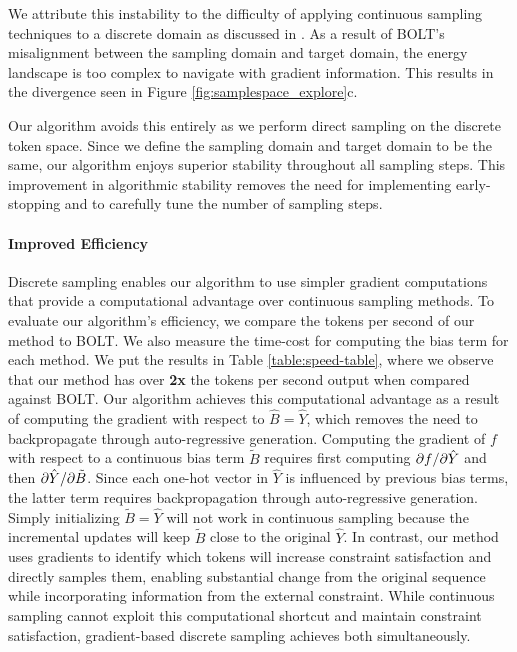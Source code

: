 We attribute this instability to the difficulty of applying continuous sampling techniques to a discrete domain as discussed in \citet{grathwohl2021gwg}. 
As a result of BOLT's misalignment between the sampling domain and target domain, the energy landscape is too complex to navigate with gradient information.
This results in the divergence seen in Figure \ref{fig:samplespace_explore}c. 



Our algorithm avoids this entirely as we perform direct sampling on the discrete token space. 
Since we define the sampling domain and target domain to be the same, our algorithm enjoys superior stability throughout all sampling steps. 
This improvement in algorithmic stability removes the need for implementing early-stopping and to carefully tune the number of sampling steps. 
\vspace{-1em}
 
\vspace{-0.8em}
\paragraph{Improved Efficiency} Discrete sampling enables our algorithm to use simpler gradient computations that provide a computational advantage over continuous sampling methods. 
To evaluate our algorithm's efficiency, we compare the tokens per second of our method to BOLT. 
We also measure the time-cost for computing the bias term for each method. 
We put the results in Table \ref{table:speed-table}, where we observe that our method has over \textbf{2x} the tokens per second output when compared against BOLT. 
Our algorithm achieves this computational advantage as a result of computing the gradient with respect to $\hat{B} = \hat{Y}$, which removes the need to backpropagate through auto-regressive generation. Computing the gradient of $f$ with respect to a continuous bias term $\tilde{B}$ requires first computing ${\partial f}/{\partial \hat{Y}}$ and then ${\partial \hat{Y}}/{\partial \tilde{B}}$.
Since each one-hot vector in $\hat{Y}$ is influenced by previous bias terms, the latter term requires backpropagation through auto-regressive generation. 
Simply initializing $\tilde{B}=\hat{Y}$ will not work in continuous sampling because the incremental updates will keep $\tilde{B}$ close to the original $\hat{Y}$. 
In contrast, our method uses gradients to identify which tokens will increase constraint satisfaction and directly samples them, enabling substantial change from the original sequence while incorporating information from the external constraint. 
While continuous sampling cannot exploit this computational shortcut and maintain constraint satisfaction, gradient-based discrete sampling achieves both simultaneously. 
